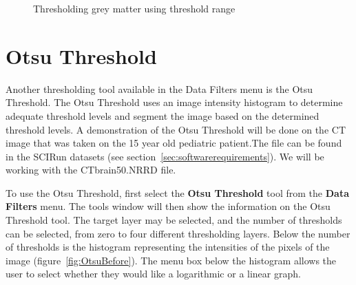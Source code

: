 \documentclass[fleqn,11pt,openany]{book}
\begin{document}
\begin{figure}
\caption{Thresholding grey matter using threshold range}\label{fig:ThresholdGrayMatter}
\end{figure}

\section{Otsu Threshold}

Another thresholding tool available in the Data Filters menu is the Otsu Threshold. The Otsu Threshold uses an image intensity histogram to determine adequate threshold levels and segment the image based on the determined threshold levels. A demonstration of the Otsu Threshold will be done on the CT image that was taken on the 15 year old pediatric patient.The file can be found in the SCIRun datasets (see section~\ref{sec:softwarerequirements}). We will be working with the CTbrain50.NRRD file.

To use the Otsu Threshold, first select the {\bf Otsu Threshold} tool from the {\bf Data Filters} menu. The tools window will then show the information on the Otsu Threshold tool. The target layer may be selected, and the number of thresholds can be selected, from zero to four different thresholding layers. Below the number of thresholds is the histogram representing the intensities of the pixels of the image (figure~\ref{fig:OtsuBefore}). The menu box below the histogram allows the user to select whether they would like a logarithmic or a linear graph.
\end{document}
